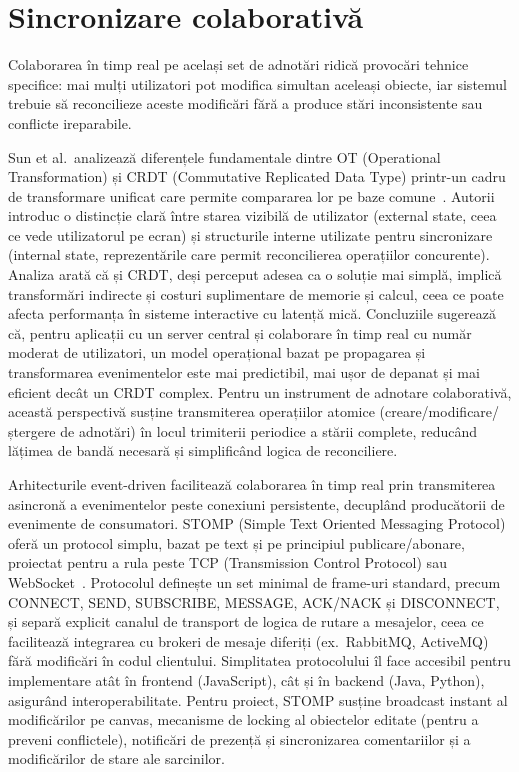\section{Sincronizare colaborativă}

Colaborarea în timp real pe același set de adnotări ridică provocări tehnice specifice: mai mulți utilizatori pot modifica simultan aceleași obiecte, iar sistemul trebuie să reconcilieze aceste modificări fără a produce stări inconsistente sau conflicte ireparabile.

Sun et al.\ analizează diferențele fundamentale dintre OT (Operational Transformation) și CRDT (Commutative Replicated Data Type) printr-un cadru de transformare unificat care permite compararea lor pe baze comune~\cite{Sun2020OTCRDT}. Autorii introduc o distincție clară între starea vizibilă de utilizator (external state, ceea ce vede utilizatorul pe ecran) și structurile interne utilizate pentru sincronizare (internal state, reprezentările care permit reconcilierea operațiilor concurente). Analiza arată că și CRDT, deși perceput adesea ca o soluție mai simplă, implică transformări indirecte și costuri suplimentare de memorie și calcul, ceea ce poate afecta performanța în sisteme interactive cu latență mică. Concluziile sugerează că, pentru aplicații cu un server central și colaborare în timp real cu număr moderat de utilizatori, un model operațional bazat pe propagarea și transformarea evenimentelor este mai predictibil, mai ușor de depanat și mai eficient decât un CRDT complex. Pentru un instrument de adnotare colaborativă, această perspectivă susține transmiterea operațiilor atomice (creare/modificare/ștergere de adnotări) în locul trimiterii periodice a stării complete, reducând lățimea de bandă necesară și simplificând logica de reconciliere.

Arhitecturile event-driven facilitează colaborarea în timp real prin transmiterea asincronă a evenimentelor peste conexiuni persistente, decuplând producătorii de evenimente de consumatori. STOMP (Simple Text Oriented Messaging Protocol) oferă un protocol simplu, bazat pe text și pe principiul publicare/abonare, proiectat pentru a rula peste TCP (Transmission Control Protocol) sau WebSocket~\cite{stomp_spec_1_2}. Protocolul definește un set minimal de frame-uri standard, precum CONNECT, SEND, SUBSCRIBE, MESSAGE, ACK/NACK și DISCONNECT, și separă explicit canalul de transport de logica de rutare a mesajelor, ceea ce facilitează integrarea cu brokeri de mesaje diferiți (ex.\ RabbitMQ, ActiveMQ) fără modificări în codul clientului. Simplitatea protocolului îl face accesibil pentru implementare atât în frontend (JavaScript), cât și în backend (Java, Python), asigurând interoperabilitate. Pentru proiect, STOMP susține broadcast instant al modificărilor pe canvas, mecanisme de locking al obiectelor editate (pentru a preveni conflictele), notificări de prezență și sincronizarea comentariilor și a modificărilor de stare ale sarcinilor.

